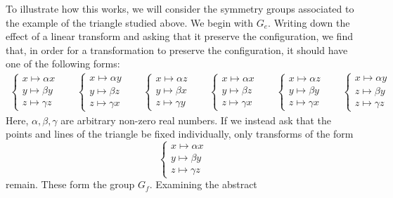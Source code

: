 \documentclass[12pt]{article}
\begin{document}
To illustrate how this works, we will consider the symmetry groups 
associated to the example of the triangle studied above.  We begin 
with $G_e$.  Writing down the effect of a linear transform and 
asking that it preserve the configuration, we find that, in order
for a transformation to preserve the configuration, it should have
one of the following forms:
\[ \begin{matrix}
\left\{ \begin{matrix} x \mapsto \alpha x \\ y \mapsto \beta y \\ 
  z \mapsto \gamma z \end{matrix} \right. \quad &
\left\{ \begin{matrix} x \mapsto \alpha y \\ y \mapsto \beta z \\ 
  z \mapsto \gamma x \end{matrix} \right. \quad &
\left\{ \begin{matrix} x \mapsto \alpha  z \\ y \mapsto \beta x \\ 
  z \mapsto \gamma y \end{matrix} \right. \quad &
\left\{ \begin{matrix} x \mapsto \alpha x \\ y \mapsto \beta z \\ 
  z \mapsto \gamma x \end{matrix} \right. \quad &
\left\{ \begin{matrix} x \mapsto \alpha z \\ y \mapsto \beta y \\ 
  z \mapsto \gamma x \end{matrix} \right. \quad &
\left\{ \begin{matrix} x \mapsto \alpha y \\ z \mapsto \beta y \\ 
  z \mapsto \gamma z \end{matrix} \right. 
\end{matrix} \]
Here, $\alpha, \beta, \gamma$ are arbitrary non-zero real numbers.  
If we instead ask that the points and lines of the triangle be fixed 
individually, only transforms of the form
\[
 \left\{ \begin{matrix} x \mapsto \alpha x \\ y \mapsto \beta y \\ 
  z \mapsto \gamma z \end{matrix} \right.
\]
remain.  These form the group $G_f$.  Examining the abstract 
\end{document}
